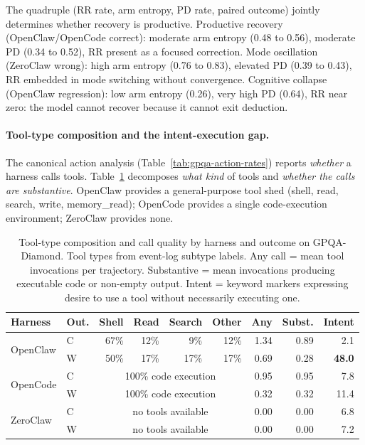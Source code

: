 The quadruple (RR rate, arm entropy, PD rate, paired outcome) jointly
determines whether recovery is productive.
Productive recovery (OpenClaw/OpenCode correct): moderate arm entropy
(0.48 to 0.56), moderate PD (0.34 to 0.52), RR present as a focused correction.
Mode oscillation (ZeroClaw wrong): high arm entropy (0.76 to 0.83), elevated
PD (0.39 to 0.43), RR embedded in mode switching without convergence.
Cognitive collapse (OpenClaw regression): low arm entropy (0.26), very high PD
(0.64), RR near zero: the model cannot recover because it cannot exit deduction.

\paragraph{Tool-type composition and the intent-execution gap.}

The canonical action analysis (Table~\ref{tab:gpqa-action-rates}) reports
\emph{whether} a harness calls tools.
Table~\ref{tab:gpqa-tool-composition} decomposes \emph{what kind} of tools and
\emph{whether the calls are substantive}.
OpenClaw provides a general-purpose tool shed (shell, read, search, write,
memory\_read); OpenCode provides a single code-execution environment;
ZeroClaw provides none.

\begin{table}[t]
\centering
\small
\caption{%
  Tool-type composition and call quality by harness and outcome on GPQA-Diamond.
  Tool types from event-log subtype labels.
  Any call = mean tool invocations per trajectory.
  Substantive = mean invocations producing executable code or non-empty output.
  Intent = keyword markers expressing desire to use a tool without necessarily
  executing one.
}
\label{tab:gpqa-tool-composition}
\setlength{\tabcolsep}{3pt}
\begin{tabular}{llrrrrrrr}
\toprule
Harness & Out. & Shell & Read & Search & Other & Any & Subst. & Intent \\
\midrule
\multirow{2}{*}{OpenClaw}
  & C & 67\% & 12\% & 9\% & 12\% & 1.34 & 0.89 &   2.1 \\
  & W & 50\% & 17\% & 17\% & 17\% & 0.69 & 0.28 & \textbf{48.0} \\
\midrule
\multirow{2}{*}{OpenCode}
  & C & \multicolumn{4}{c}{100\% code execution} & 0.95 & 0.95 &   7.8 \\
  & W & \multicolumn{4}{c}{100\% code execution} & 0.32 & 0.32 &  11.4 \\
\midrule
\multirow{2}{*}{ZeroClaw}
  & C & \multicolumn{4}{c}{no tools available} & 0.00 & 0.00 &   6.8 \\
  & W & \multicolumn{4}{c}{no tools available} & 0.00 & 0.00 &   7.2 \\
\bottomrule
\end{tabular}
\end{table}

